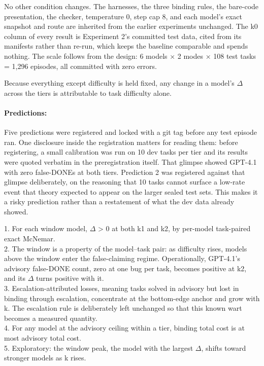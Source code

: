 No other condition changes. The harnesses, the three binding rules, the bare-code presentation, the checker, temperature 0, step cap 8, and each model's exact snapshot and route are inherited from the earlier experiments unchanged. The k0 column of every result is Experiment 2's committed test data, cited from its manifests rather than re-run, which keeps the baseline comparable and spends nothing. The scale follows from the design: 6 models × 2 modes × 108 test tasks = 1,296 episodes, all committed with zero errors.

Because everything except difficulty is held fixed, any change in a model's $\Delta$ across the tiers is attributable to task difficulty alone.

\paragraph{Predictions:} Five predictions were registered and locked with a git tag before any test episode ran. One disclosure inside the registration matters for reading them: before registering, a small calibration was run on 10 dev tasks per tier and its results were quoted verbatim in the preregistration itself. That glimpse showed GPT-4.1 with zero false-DONEs at both tiers. Prediction 2 was registered against that glimpse deliberately, on the reasoning that 10 tasks cannot surface a low-rate event that theory expected to appear on the larger sealed test sets. This makes it a risky prediction rather than a restatement of what the dev data already showed.

1. For each window model, $\Delta$ > 0 at both k1 and k2, by per-model task-paired exact McNemar.\\
2. The window is a property of the model--task pair: as difficulty rises, models above the window enter the false-claiming regime. Operationally, GPT-4.1's advisory false-DONE count, zero at one bug per task, becomes positive at k2, and its $\Delta$ turns positive with it.\\
3. Escalation-attributed losses, meaning tasks solved in advisory but lost in binding through escalation, concentrate at the bottom-edge anchor and grow with k. The escalation rule is deliberately left unchanged so that this known wart becomes a measured quantity.\\
4. For any model at the advisory ceiling within a tier, binding total cost is at most advisory total cost.\\
5. Exploratory: the window peak, the model with the largest $\Delta$, shifts toward stronger models as k rises.

